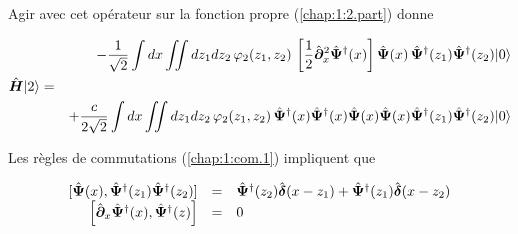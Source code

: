 Agir avec cet opérateur sur la fonction propre (\ref{chap:1:2.part}) donne 

\begin{eqnarray}
	& & - \frac{1}{ \sqrt{2}} \int dx \iint dz_1 dz_2 \, \varphi_2(z_1, z_2) \,	\left [\frac{1}{2}\hat{\bm{\partial}}_x^2 \hat{\bm{\Psi}}^\dag(x)\right ] \hat{\bm{\Psi}}(x)\,  \hat{\bm{\Psi}}^\dag(z_1)\hat{\bm{\Psi}}^\dag(z_2) \vert 0 \rangle \label{chap:1:hal.mod.2.part.1}\\
	\hat{\bm{H}}\vert 2 \rangle & = & \nonumber \\
	& & +\frac{c}{ 2\sqrt{2}} \int dx  \iint dz_1 dz_2 \,  \varphi_2(z_1, z_2) 	\, \hat{\bm{\Psi}}^\dag(x)\hat{\bm{\Psi}}^\dag(x) \hat{\bm{\Psi}}(x)\hat{\bm{\Psi}}(x)  \hat{\bm{\Psi}}^\dag(z_1) \hat{\bm{\Psi}}^\dag(z_2) \vert 0 \rangle \label{chap:1:hal.mod.2.part.2} 
\end{eqnarray}

Les règles de commutations (\ref{chap:1:com.1}) impliquent que 

\begin{eqnarray}
	\left . \begin{array}{rcl}
		[ \hat{\bm{\Psi}}(x),  \hat{\bm{\Psi}}^\dag(z_1) \hat{\bm{\Psi}}^\dag(z_2)  ]  &=&  \hat{\bm{\Psi}}^\dag(z_2)  \hat{\bm{\delta}}(x-z_1) +  \hat{\bm{\Psi}}^\dag(z_1) \hat{\bm{\delta}}(x-z_2)  \\
		\left [ \hat{\bm{\partial}}_x\hat{\bm{\Psi}}^\dag(x),  \hat{\bm{\Psi}}^\dag(z) \right ]   & =  & 0 
	\end{array} \right . \label{chap:1:2.part.com.2}
\end{eqnarray}


